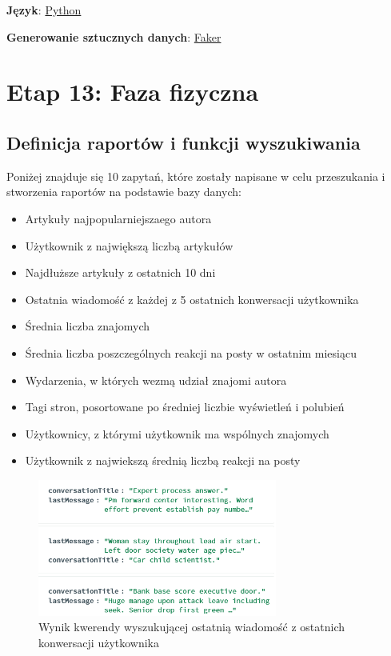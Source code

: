 \documentclass{article}
\begin{document}
\textbf{Język}: \href{https://www.python.org/}{Python}

\textbf{Generowanie sztucznych danych}: \href{https://faker.readthedocs.io/en/master/}{Faker}


\section{Etap 13: Faza fizyczna }

\subsection{Definicja raportów i funkcji wyszukiwania}
\quad Poniżej znajduje się 10 zapytań, które zostały napisane w celu przeszukania i stworzenia raportów na podstawie bazy danych:

\begin{itemize}
    \item Artykuły najpopularniejszaego autora
    \item Użytkownik z największą liczbą artykułów
    \item Najdłuższe artykuły z ostatnich 10 dni
    \item Ostatnia wiadomość z każdej z 5 ostatnich konwersacji użytkownika
    \item Średnia liczba znajomych
    \item Średnia liczba poszczególnych reakcji na posty w ostatnim miesiącu
    \item Wydarzenia, w których wezmą udział znajomi autora
    \item Tagi stron, posortowane po średniej liczbie wyświetleń i polubień
    \item Użytkownicy, z którymi użytkownik ma wspólnych znajomych
    \item Użytkownik z najwiekszą średnią liczbą reakcji na posty
\end{itemize}

\begin{figure}[H]
    \centering
    \includegraphics[width=0.7\textwidth]{docs/images/last_message_nosql.png}
    \caption{Wynik kwerendy wyszukującej ostatnią wiadomość z ostatnich konwersacji użytkownika}
    \label{fig:nosql_1}
\end{figure}
\end{document}
